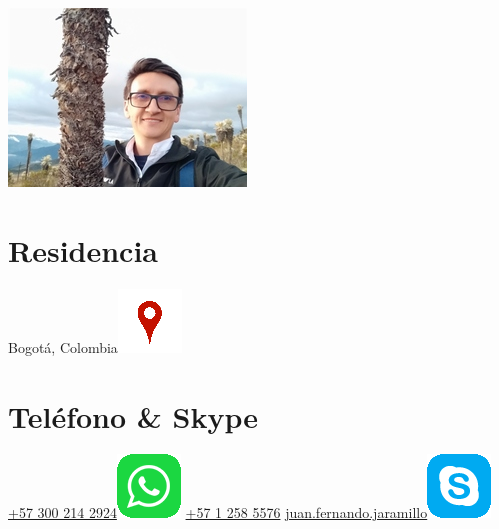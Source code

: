 \begin{aside}
  \includegraphics[scale=0.28]{img/coruscan.jpg}
   ~
  \section{Residencia}
    Bogotá, Colombia\includegraphics[scale=0.15]{img/ubicacion.png}
    ~
  \section{Teléfono \& Skype}
    \href{callto:+573002142924}{+57 300 214 2924\includegraphics[scale=0.15]{img/whatsapp.png}}
    \href{callto:+5712585576}{+57 1 258 5576}
    \href{skype:juan.fernando.jaramillo}{\small{juan.fernando.jaramillo}\includegraphics[scale=0.15]{img/skype.png}}
    ~

\end{aside}

